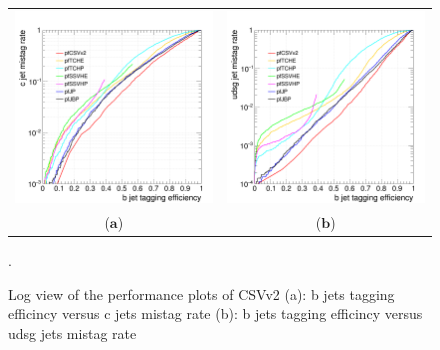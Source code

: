 \documentclass{cmspaper}
\begin{document}
\begin{figure}[htp]
\centering
\begin{tabular}{cc}
\hspace{-0.5cm}
\includegraphics[scale=0.30]{genPlots/btagged/bTagEffVsMistagRate_c.png}
& \hspace{-0.60cm} \includegraphics[scale=0.30]{genPlots/btagged/bTagEffVsMistagRate_udsg.png}\\
   ($\mathbf{a}$)\qquad\qquad&($\mathbf{b}$)\qquad\qquad\qquad\\
\end{tabular}
\caption{Log view of the performance plots of CSVv2 (a): b jets tagging efficincy versus c jets mistag rate (b): b jets tagging efficincy versus udsg jets mistag rate}.\label{performance_CSVv2}
\end{figure}
\end{document}
